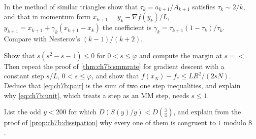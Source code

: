 \begin{exercise}
In the method of similar triangles show that $\tau_k=a_{k+1}/A_{k+1}$ satisfies
$\tau_k\sim2/k$, and that in momentum form $x_{k+1}=y_k-\nabla f(y_k)/L$,
$y_{k+1}=x_{k+1}+\gamma_k(x_{k+1}-x_k)$ the coefficient is
$\gamma_k=\tau_{k+1}(1-\tau_k)/\tau_k$. Compare with Nesterov's $(k-1)/(k+2)$.
\end{exercise}

\begin{exercise}
Show that $s(s^2-s-1)\le0$ for $0<s\le\varphi$ and compute the margin at
$s=\lt$. Then repeat the proof of \cref{thm:ch7b:smmrate} for gradient descent
with a constant step $s/L$, $0<s\le\varphi$, and show that
$f(x_N)-f_*\le LR^2/(2sN)$. Deduce that \eqref{eq:ch7b:pair} is the sum of two one step inequalities, and explain why
\eqref{eq:ch7b:unit}, which treats a step as an MM step, needs $s\le1$.
\end{exercise}

\begin{exercise}
List the odd $y<200$ for which $D(S(y)/y)<D(\tfrac34)$, and explain from the
proof of \cref{prop:ch7b:dissipation} why every one of them is congruent to $1$
modulo $8$.
\end{exercise}
